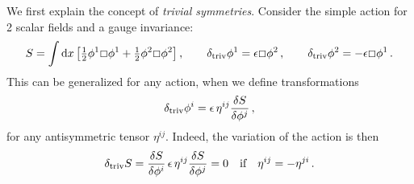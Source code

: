 \documentclass[a4paper,11pt,twoside]{article}
\newcommand{\Red}[1]{#1}
\newcommand{\OliveGreen}[1]{#1}
\newcommand{\Blue}[1]{#1}
\newcommand{\ft}[2]{{\textstyle\frac{#1}{#2}}}
\def\rmd{{\rm d}}
\newcommand{\bbox}{\lower.2ex\hbox{$\Box$}}
\begin{document}
We first explain the concept of \emph{trivial symmetries}. Consider the
simple action for 2 scalar fields and a gauge invariance:
\begin{equation}
  S=\int
  \rmd x\left[\ft12\Blue{\phi^1}\bbox\Blue{\phi^1}+\ft12\Blue{\phi^2}\bbox\Blue{\phi^2}\right],\qquad
  \delta_{\rm triv} \Blue{\phi^1 }=\OliveGreen{\epsilon}\bbox\Blue{\phi^2}\,, \qquad
 \delta_{\rm triv} \Blue{\phi^2 }=-\OliveGreen{\epsilon}\bbox\Blue{\phi^1}\,.
 \label{symm2scal}
\end{equation}
This can be generalized for any action, when we define transformations
\begin{equation}
  \delta_{\rm triv} \Blue{\phi^i }=\OliveGreen{\epsilon }\,\Red{\eta ^{ij}}\frac{\delta S}{\delta \Blue{\phi
  ^j}}\,,
 \label{DelTriv}
\end{equation}
for any antisymmetric tensor $\Red{\eta ^{ij}}$. Indeed, the variation of
the action is then
\begin{equation}
  \delta_{\rm triv} S=\frac{\delta S}{\delta \Blue{\phi ^i}}\,\OliveGreen{\epsilon }\,\Red{\eta ^{ij}}\frac{\delta S}{\delta \Blue{\phi ^j}}
=0\quad \mbox{if}\quad \Red{\eta ^{ij}}=\Red{-\eta ^{ji}}\,.
 \label{delStriv}
\end{equation}
\end{document}
